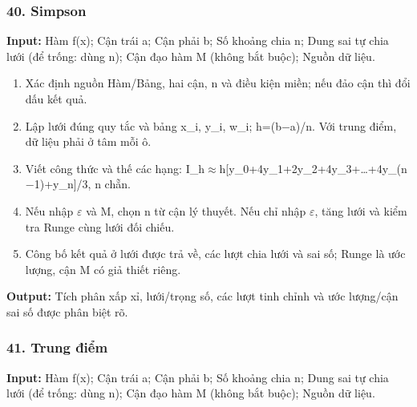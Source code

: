 \examplebreak\subsubsection*{40. Simpson}

\textbf{Input:} Hàm f(\allowbreak{}x);\allowbreak{} Cận trái a;\allowbreak{} Cận phải b;\allowbreak{} Số khoảng chia n;\allowbreak{} Dung sai tự chia lưới (\allowbreak{}để trống: dùng n);\allowbreak{} Cận đạo hàm M (\allowbreak{}không bắt buộc);\allowbreak{} Nguồn dữ liệu.

\begin{enumerate}

\item Xác định nguồn Hàm/\allowbreak{}Bảng,\allowbreak{} hai cận,\allowbreak{} n và điều kiện miền;\allowbreak{} nếu đảo cận thì đổi dấu kết quả.

\item Lập lưới đúng quy tắc và bảng x\_i,\allowbreak{} y\_i,\allowbreak{} w\_i;\allowbreak{} h=\allowbreak{}(\allowbreak{}b\ensuremath{-}a)/\allowbreak{}n. Với trung điểm,\allowbreak{} dữ liệu phải ở tâm mỗi ô.

\item Viết công thức và thế các hạng: I\_h\ensuremath{\approx}h[y\_0+\allowbreak{}4y\_1+\allowbreak{}2y\_2+\allowbreak{}4y\_3+\allowbreak{}…+\allowbreak{}4y\_(\allowbreak{}n\ensuremath{-}1)+\allowbreak{}y\_n]/\allowbreak{}3,\allowbreak{} n chẵn.

\item Nếu nhập \ensuremath{\varepsilon} và M,\allowbreak{} chọn n từ cận lý thuyết. Nếu chỉ nhập \ensuremath{\varepsilon},\allowbreak{} tăng lưới và kiểm tra Runge cùng lưới đối chiếu.

\item Công bố kết quả ở lưới được trả về,\allowbreak{} các lượt chia lưới và sai số;\allowbreak{} Runge là ước lượng,\allowbreak{} cận M có giả thiết riêng.

\end{enumerate}

\textbf{Output:} Tích phân xấp xỉ,\allowbreak{} lưới/\allowbreak{}trọng số,\allowbreak{} các lượt tinh chỉnh và ước lượng/\allowbreak{}cận sai số được phân biệt rõ.

\examplebreak\subsubsection*{41. Trung điểm}

\textbf{Input:} Hàm f(\allowbreak{}x);\allowbreak{} Cận trái a;\allowbreak{} Cận phải b;\allowbreak{} Số khoảng chia n;\allowbreak{} Dung sai tự chia lưới (\allowbreak{}để trống: dùng n);\allowbreak{} Cận đạo hàm M (\allowbreak{}không bắt buộc);\allowbreak{} Nguồn dữ liệu.

